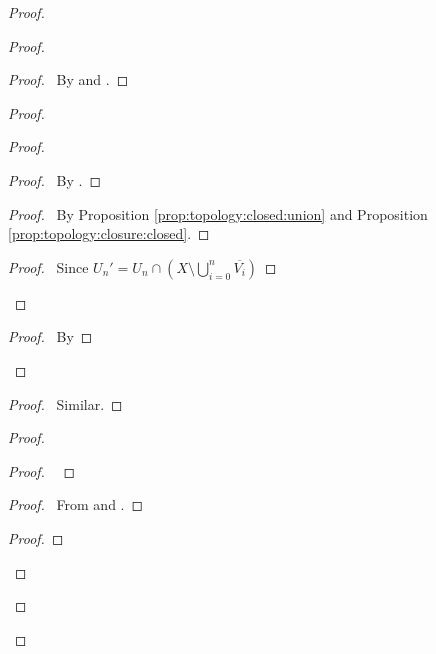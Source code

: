 \begin{proof}
\begin{proof}
   \begin{proof}
     \pf\ By  and .
   \end{proof}
   \begin{proof}
     \begin{proof}
       \begin{proof}
         \pf\ By .
       \end{proof}
       \begin{proof}
         \pf\ By Proposition \ref{prop:topology:closed:union} and Proposition \ref{prop:topology:closure:closed}.
       \end{proof}
       \qedstep
       \begin{proof}
         \pf\ Since $U_n' = U_n \cap (X \setminus \bigcup_{i=0}^n \overline{V_i})$ %
       \end{proof}
     \end{proof}
     \qedstep
     \begin{proof}
       \pf\ By 
     \end{proof}
   \end{proof}
   \begin{proof}
     \pf\ Similar.
   \end{proof}
   \begin{proof}
     \begin{proof}
       \pf\ 
     \end{proof}
     \begin{proof}
       \pf\ From  and .
     \end{proof}
     \qedstep
     \begin{proof}

\end{proof}
\end{proof}
\end{proof}
\end{proof}
